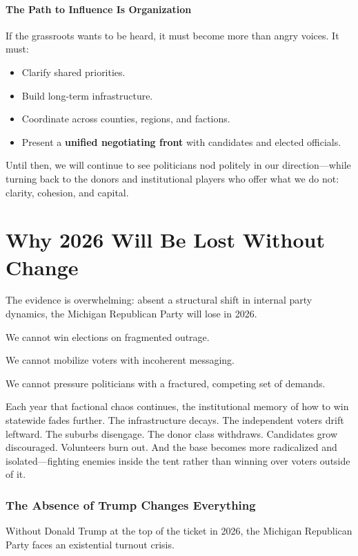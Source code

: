 \subsubsection{The Path to Influence Is Organization}
If the grassroots wants to be heard, it must become more than angry voices. It must:
\begin{itemize}
\item Clarify shared priorities.
\item Build long-term infrastructure.
\item Coordinate across counties, regions, and factions.
\item Present a \textbf{unified negotiating front} with candidates and elected officials.
\end{itemize}

Until then, we will continue to see politicians nod politely in our direction—while turning back to the donors and institutional players who offer what we do not: clarity, cohesion, and capital.


\chapter{Why 2026 Will Be Lost Without Change}

The evidence is overwhelming: absent a structural shift in internal party dynamics, the Michigan Republican Party will lose in 2026.

We cannot win elections on fragmented outrage.

We cannot mobilize voters with incoherent messaging.

We cannot pressure politicians with a fractured, competing set of demands.

Each year that factional chaos continues, the institutional memory of how to win statewide fades further. The infrastructure decays. The independent voters drift leftward. The suburbs disengage. The donor class withdraws. Candidates grow discouraged. Volunteers burn out. And the base becomes more radicalized and isolated—fighting enemies inside the tent rather than winning over voters outside of it.

\subsection{The Absence of Trump Changes Everything}
Without Donald Trump at the top of the ticket in 2026, the Michigan Republican Party faces an existential turnout crisis.


